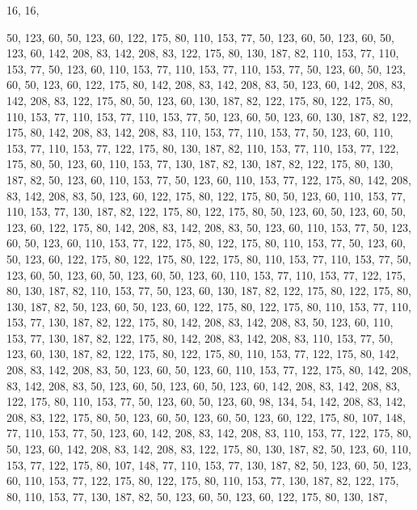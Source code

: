 16, 16,

50, 123, 60, 50, 123, 60, 122, 175, 80, 110, 153, 77, 50, 123, 60, 50,
123, 60, 50, 123, 60, 142, 208, 83, 142, 208, 83, 122, 175, 80, 130, 187,
82, 110, 153, 77, 110, 153, 77, 50, 123, 60, 110, 153, 77, 110, 153, 77,
110, 153, 77, 50, 123, 60, 50, 123, 60, 50, 123, 60, 122, 175, 80, 142,
208, 83, 142, 208, 83, 50, 123, 60, 142, 208, 83, 142, 208, 83, 122, 175,
80, 50, 123, 60, 130, 187, 82, 122, 175, 80, 122, 175, 80, 110, 153, 77,
110, 153, 77, 110, 153, 77, 50, 123, 60, 50, 123, 60, 130, 187, 82, 122,
175, 80, 142, 208, 83, 142, 208, 83, 110, 153, 77, 110, 153, 77, 50, 123,
60, 110, 153, 77, 110, 153, 77, 122, 175, 80, 130, 187, 82, 110, 153, 77,
110, 153, 77, 122, 175, 80, 50, 123, 60, 110, 153, 77, 130, 187, 82, 130,
187, 82, 122, 175, 80, 130, 187, 82, 50, 123, 60, 110, 153, 77, 50, 123,
60, 110, 153, 77, 122, 175, 80, 142, 208, 83, 142, 208, 83, 50, 123, 60,
122, 175, 80, 122, 175, 80, 50, 123, 60, 110, 153, 77, 110, 153, 77, 130,
187, 82, 122, 175, 80, 122, 175, 80, 50, 123, 60, 50, 123, 60, 50, 123,
60, 122, 175, 80, 142, 208, 83, 142, 208, 83, 50, 123, 60, 110, 153, 77,
50, 123, 60, 50, 123, 60, 110, 153, 77, 122, 175, 80, 122, 175, 80, 110,
153, 77, 50, 123, 60, 50, 123, 60, 122, 175, 80, 122, 175, 80, 122, 175,
80, 110, 153, 77, 110, 153, 77, 50, 123, 60, 50, 123, 60, 50, 123, 60,
50, 123, 60, 110, 153, 77, 110, 153, 77, 122, 175, 80, 130, 187, 82, 110,
153, 77, 50, 123, 60, 130, 187, 82, 122, 175, 80, 122, 175, 80, 130, 187,
82, 50, 123, 60, 50, 123, 60, 122, 175, 80, 122, 175, 80, 110, 153, 77,
110, 153, 77, 130, 187, 82, 122, 175, 80, 142, 208, 83, 142, 208, 83, 50,
123, 60, 110, 153, 77, 130, 187, 82, 122, 175, 80, 142, 208, 83, 142, 208,
83, 110, 153, 77, 50, 123, 60, 130, 187, 82, 122, 175, 80, 122, 175, 80,
110, 153, 77, 122, 175, 80, 142, 208, 83, 142, 208, 83, 50, 123, 60, 50,
123, 60, 110, 153, 77, 122, 175, 80, 142, 208, 83, 142, 208, 83, 50, 123,
60, 50, 123, 60, 50, 123, 60, 142, 208, 83, 142, 208, 83, 122, 175, 80,
110, 153, 77, 50, 123, 60, 50, 123, 60, 98, 134, 54, 142, 208, 83, 142,
208, 83, 122, 175, 80, 50, 123, 60, 50, 123, 60, 50, 123, 60, 122, 175,
80, 107, 148, 77, 110, 153, 77, 50, 123, 60, 142, 208, 83, 142, 208, 83,
110, 153, 77, 122, 175, 80, 50, 123, 60, 142, 208, 83, 142, 208, 83, 122,
175, 80, 130, 187, 82, 50, 123, 60, 110, 153, 77, 122, 175, 80, 107, 148,
77, 110, 153, 77, 130, 187, 82, 50, 123, 60, 50, 123, 60, 110, 153, 77,
122, 175, 80, 122, 175, 80, 110, 153, 77, 130, 187, 82, 122, 175, 80, 110,
153, 77, 130, 187, 82, 50, 123, 60, 50, 123, 60, 122, 175, 80, 130, 187,
